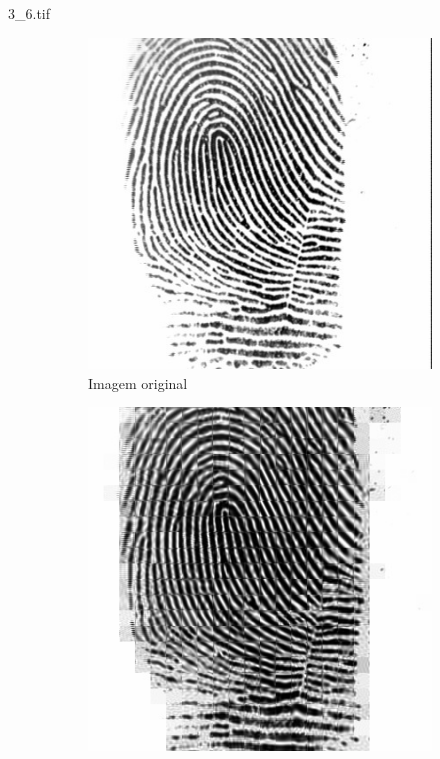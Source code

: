 \documentclass{beamer}
\begin{document}
    \begin{frame}{3\_6.tif}
        \begin{figure}
            \centering
            \begin{subfigure}[!ht]{0.32\textwidth}
                \includegraphics[width=\columnwidth]{Fingerprints/3_6.jpg}
                \caption{Imagem original}
            \end{subfigure}
            \begin{subfigure}[!ht]{0.32\textwidth}
                \includegraphics[width=\columnwidth]{Fingerprints/3_6_intermediate.jpg}

\end{subfigure}
\end{figure}
\end{frame}
\end{document}
